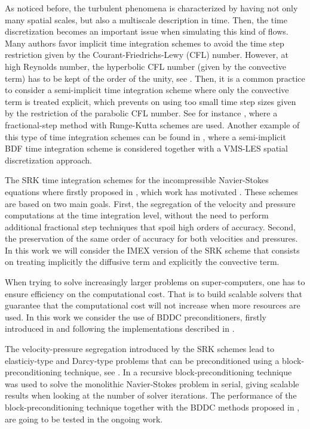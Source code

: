As noticed before, the turbulent phenomena is characterized by having not only many spatial scales, but also a multiscale description in time. Then, the time discretization becomes an important issue when simulating this kind of flows. Many authors favor implicit time integration schemes to avoid the time step restriction given by the Courant-Friedrichs-Lewy (CFL) number. However, at high Reynolds number, the hyperbolic CFL number (given by the convective term) has to be kept of the order of the unity, see \cite{choi_effects_1994}. Then, it is a common practice to consider a semi-implicit time integration scheme where only the convective term is treated explicit, which prevents on using too small time step sizes given by the restriction of the parabolic CFL number. See for instance \cite{le_improvement_1991}, where a fractional-step method with Runge-Kutta schemes are used. Another example of this type of time integration schemes can be found in \cite{forti_semi-implicit_2015}, where a semi-implicit BDF time integration scheme is considered together with a VMS-LES spatial discretization approach.

The SRK time integration schemes for the incompressible Navier-Stokes equations where firstly proposed in \cite{colomes_segregated_2015}, which work has motivated . These schemes are based on two main goals. First, the segregation of the velocity and pressure computations at the time integration level, without the need to perform additional fractional step techniques that spoil high orders of accuracy. Second, the preservation of the same order of accuracy for both velocities and pressures. In this work we will consider the IMEX version of the SRK scheme that consists on treating implicitly the diffusive term and explicitly the convective term.

When trying to solve increasingly larger problems on super-computers, one has to ensure efficiency on the computational cost. That is to build scalable solvers that guarantee that the computational cost will not increase when more resources are used. In this work we consider the use of BDDC preconditioners, firstly introduced in \cite{dohrmann_preconditioner_2003} and following the implementations described in \cite{badia_highly_2014,alberto_f._martin_santiago_badia_and_javier_principe_multilevel_????}.

The velocity-pressure segregation introduced by the SRK schemes lead to elasticiy-type and Darcy-type problems that can be preconditioned using a block-preconditioning technique, see \cite{badia_block_2014}. In \cite{colomes_mixed_2015} a recursive block-preconditioning technique was used to solve the monolithic Navier-Stokes problem in serial, giving scalable results when looking at the number of solver iterations. The performance of the block-preconditioning technique together with the BDDC methods proposed in \cite{alberto_f._martin_santiago_badia_and_javier_principe_multilevel_????}, are going to be tested in the ongoing work.

